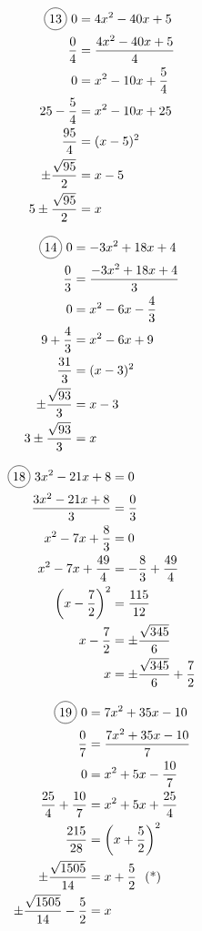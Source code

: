 \begin{multicols}{2}
\begin{align*}
  \circled{13}\ 0&=4x^{2}-40x+5\\
  \frac{0}{4}&=\frac{4x^{2}-40x+5}{4}\\
  0&=x^{2}-10x+\frac{5}{4}\\
  25-\frac{5}{4}&=x^{2}-10x+25\\
  \frac{95}{4}&=(x-5)^{2}\\
  \pm \frac{\sqrt{95}}{2}&=x-5\\
  5\pm\frac{\sqrt{95}}{2}&=x
\end{align*}

\begin{align*}
  \circled{14}\ 0&=-3x^{2}+18x+4\\
  \frac{0}{3}&=\frac{-3x^{2}+18x+4}{3}\\
  0&=x^{2}-6x-\frac{4}{3}\\
  9+\frac{4}{3}&=x^{2}-6x+9\\
  \frac{31}{3}&=(x-3)^{2}\\
  \pm \frac{\sqrt{93}}{3}&=x-3\\
  3\pm\frac{\sqrt{93}}{3}&=x
\end{align*}

\begin{align*}
  \circled{18}\ 3x^{2}-21x+8&=0\\
  \frac{3x^{2}-21x+8}{3}&=\frac{0}{3}\\
  x^{2}-7x+\frac{8}{3}&=0\\
  x^{2}-7x+\frac{49}{4}&=-\frac{8}{3}+\frac{49}{4}\\
  \left(x-\frac{7}{2}\right)^{2}&=\frac{115}{12}\\
  x-\frac{7}{2}&=\pm \frac{\sqrt{345}}{6}\\
  x&=\pm \frac{\sqrt{345}}{6}+\frac{7}{2}
\end{align*}

\begin{align*}
  \circled{19}\ 0&=7x^{2}+35x-10\\
  \frac{0}{7}&=\frac{7x^{2}+35x-10}{7}\\
  0&=x^{2}+5x-\frac{10}{7}\\
  \frac{25}{4}+\frac{10}{7}&=x^{2}+5x+\frac{25}{4}\\
  \frac{215}{28}&=\left(x+\frac{5}{2}\right)^{2}\\
  \pm \frac{\sqrt{1505}}{14}&=x+\frac{5}{2}\ \text{ (*)}\\
  \pm \frac{\sqrt{1505}}{14}-\frac{5}{2}&=x\\
\end{align*}
\end{multicols}

